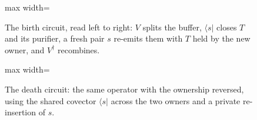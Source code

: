 \begin{figure}[t]
\centering
\begin{adjustbox}{max width=\linewidth}

\end{adjustbox}
\caption{The birth circuit, read left to right: $V$ splits the buffer, $\langle s|$ closes $T$ and its purifier, a fresh pair $s$ re-emits them with $T$ held by the new owner, and $V^\dagger$ recombines.}\label{fig:qc-birth}
\end{figure}

\begin{figure}[t]
\centering
\begin{adjustbox}{max width=\linewidth}

\end{adjustbox}
\caption{The death circuit: the same operator with the ownership reversed, using the shared covector $\langle s|$ across the two owners and a private re-insertion of $s$.}\label{fig:qc-death}
\end{figure}

